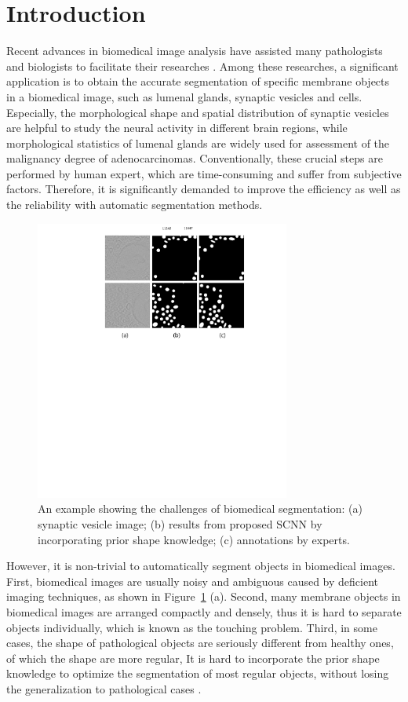 \section{Introduction}
Recent advances in biomedical image analysis have assisted many pathologists and biologists to facilitate their researches \cite{Chen2016b, Ronneberger2015,Chen2016c,Lieman-Sifry2017,Paszke2016,Tseng2017,Sirinukunwattana2015b}.
Among these researches, a significant application is to obtain the accurate segmentation of specific membrane objects in a biomedical image, such as lumenal glands, synaptic vesicles and cells.
Especially, the morphological shape and spatial distribution of synaptic vesicles are helpful to study the neural activity in different brain regions, while morphological statistics of lumenal glands are widely used for assessment of the malignancy degree of adenocarcinomas.
%
Conventionally, these crucial steps are performed by human expert, which are time-consuming and suffer from subjective factors.
Therefore, it is significantly demanded to improve the efficiency as well as the reliability with automatic segmentation methods.

\begin{figure}
    \begin{center}
        \includegraphics[width=3.3in]{figures/FigImg.pdf}
    \end{center}
    \caption{An example showing the challenges of biomedical segmentation: (a) synaptic vesicle image; (b) results from proposed SCNN by incorporating prior shape knowledge; (c) annotations by experts.}
    \label{FigImgs}
\end{figure}

However, it is non-trivial to automatically segment objects in biomedical images.
First, biomedical images are usually noisy and ambiguous caused by deficient imaging techniques, as shown in Figure~\ref{FigImgs} (a).
Second, many membrane objects in biomedical images are arranged compactly and densely, thus it is hard to separate objects individually, which is known as the touching problem.
Third, in some cases, the shape of pathological objects are seriously different from healthy ones, of which the shape are more regular,
It is hard to incorporate the prior shape knowledge to optimize the segmentation of most regular objects, without losing the generalization to pathological cases \cite{Sirinukunwattana2015b}.


